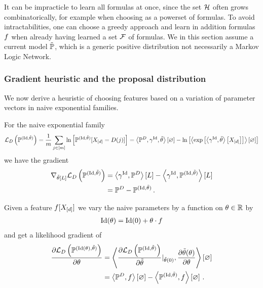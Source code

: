 It can be impracticle to learn all formulas at once, since the set $\mathcal{H}$ often grows combinatorically, for example when choosing as a powerset of formulas.
To avoid intractabilities, one can choose a greedy approach and learn in addition formulas $f$ when already having learned a set $\mathcal{F}$ of formulas.
We in this section assume a current model $\tilde{\mathbb{P}}$, which is a generic positive distribution not necessarily a Markov Logic Network. %




\subsubsection{Gradient heuristic and the proposal distribution}

We now derive a heuristic of choosing features based on a variation of parameter vectors in naive exponential families.

For the naive exponential family 
\begin{align*}
	\mathcal{L}_{D}\left(\mathbb{P}^{(\mathrm{Id}, \tilde{\theta})}\right) 
	= \frac{1}{m} \sum_{j\in[m]}\ln \left[ \mathbb{P}^{(\mathrm{Id}, \tilde{\theta})}[X_{[d]}=D(j)] \right]
	= \left\langle \mathbb{P}^{D}, \gamma^{\mathrm{Id}}, \tilde{\theta}\right\rangle \left[ \varnothing \right] - \ln \left[ \left\langle \mathrm{exp}\left[\left\langle \gamma^{\mathrm{Id}}, \tilde{\theta}\right\rangle \left[ X_{[d]} \right]\right]\right\rangle \left[ \varnothing \right] \right] 
\end{align*}
we have the gradient
\begin{align*}
	\nabla_{\tilde{\theta}\left[L\right]} \mathcal{L}_{D}\left(\mathbb{P}^{(\mathrm{Id}, \tilde{\theta})}\right)
	&= \left\langle \gamma^{\mathrm{Id}},\mathbb{P}^{D}\right\rangle \left[ L \right] - \left\langle \gamma^{\mathrm{Id}},\mathbb{P}^{(\mathrm{Id}, \tilde{\theta})}\right\rangle \left[ L \right] \\
	&= \mathbb{P}^{D} - \mathbb{P}^{(\mathrm{Id}, \tilde{\theta})} \, . 
\end{align*}

Given a feature $f[X_{[d]}]$ we vary the naive parameters by a function on $\theta\in\mathbb{R}$ by
\begin{align*}
	 \naivestat(\canparam) %
	= \naivestat(0) + \canparam\cdot\exfunction
\end{align*}
and get a likelihood gradient of
\begin{align*}
	 \frac{\partial \mathcal{L}_{D}\left(\mathbb{P}^{(\mathrm{Id}(\theta), \tilde{\theta})}\right)}{\partial\theta} 
	 &= \left\langle 
	 	\frac{\partial\mathcal{L}_{D}\left(\mathbb{P}^{(\mathrm{Id}, \tilde{\theta})}\right)}{\partial\tilde{\theta}}|_{\tilde{\theta}(0)},
		\frac{\partial\tilde{\theta}(\theta)}{\partial\theta} 
	 \right\rangle \left[ \varnothing \right]  \\
	 &= \left\langle \mathbb{P}^{D},f\right\rangle \left[ \varnothing \right] -   \left\langle \mathbb{P}^{(\mathrm{Id}, \tilde{\theta})},f\right\rangle \left[ \varnothing \right] \, .
\end{align*}


